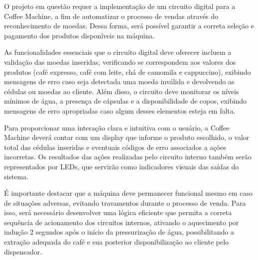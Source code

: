 O projeto em questão requer a implementação de um circuito digital para a Coffee Machine, a fim de automatizar o processo de vendas através do reconhecimento de moedas. Dessa forma, será possível garantir a correta seleção e pagamento dos produtos disponíveis na máquina.

As funcionalidades essenciais que o circuito digital deve oferecer incluem a validação das moedas inseridas, verificando se correspondem aos valores dos produtos (café expresso, café com leite, chá de camomila e cappuccino), exibindo mensagens de erro caso seja detectada uma moeda inválida e devolvendo as cédulas ou moedas ao cliente. Além disso, o circuito deve monitorar os níveis mínimos de água, a presença de cápsulas e a disponibilidade de copos, exibindo mensagens de erro apropriadas caso algum desses elementos esteja em falta.

Para proporcionar uma interação clara e intuitiva com o usuário, a Coffee Machine deverá contar com um display que informe o produto escolhido, o valor total das cédulas inseridas e eventuais códigos de erro associados a ações incorretas. Os resultados das ações realizadas pelo circuito interno também serão representados por LEDs, que servirão como indicadores visuais das saídas do sistema.

É importante destacar que a máquina deve permanecer funcional mesmo em caso de situações adversas, evitando travamentos durante o processo de venda. Para isso, será necessário desenvolver uma lógica eficiente que permita a correta sequência de acionamento dos circuitos internos, ativando o aquecimento por indução 2 segundos após o início da pressurização de água, possibilitando a extração adequada do café e sua posterior disponibilização ao cliente pelo dispensador.
